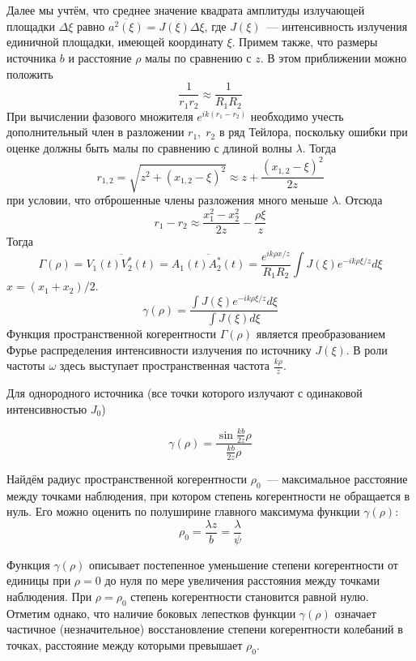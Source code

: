Далее мы учтём, что среднее значение квадрата амплитуды излучающей площадки $\Delta\xi$ равно $\overline{a^{2}\left(\xi\right)} = J(\xi) \Delta\xi$, где $J(\xi)$~---  интенсивность излучения единичной площадки, имеющей координату $\xi$. Примем также, что размеры источника $b$ и расстояние $\rho$ малы по сравнению с $z$.  В этом приближении можно положить
\[
    \frac{1}{r_{1}r_{2}} \approx \frac{1}{R_{1}R_{2}}
\]
 При вычислении фазового множителя $e^{ik\left(r_{1}-r_{2}\right)}$ необходимо учесть дополнительный член в разложении $r_{1},\; r_{2}$ в ряд Тейлора, поскольку ошибки при оценке должны быть малы по сравнению с длиной волны $\lambda$. Тогда
 \[
     r_{1,2} = \sqrt{z^{2} + \left(x_{1,2} - \xi\right)^{2}} \approx z + \frac{\left(x_{1,2} - \xi\right)^{2}}{2z}
 \]
при условии, что отброшенные члены разложения много меньше $\lambda$. Отсюда
\[
    r_{1} - r_{2} \approx \frac{x_{1}^{2} - x^{2}_{2}}{2z} - \frac{\rho\xi}{z}
\]
Тогда
\[
    \Gamma(\rho) = \overline{V_{1}(t)V_{2}^{*}(t)} = \overline{A_{1}(t)A_{2}^{*}(t)} = \frac{e^{ik\rho x/z}}{R_{1}R_{2}}\int J(\xi)e^{-ik\rho\xi / z} d\xi
\]
$x = (x_{1} + x_{2}) / 2$.
\[
    \gamma(\rho) = \frac{\int J(\xi)e^{-ik\rho\xi / z} d\xi}{\int J(\xi)d\xi}
\]
Функция пространственной когерентности $\Gamma(\rho)$ является преобразованием Фурье распределения интенсивности излучения по источнику $J(\xi)$. В роли частоты $\omega$ здесь выступает пространственная частота $\frac{k\rho}{z}$.

Для однородного источника (все точки которого излучают с одинаковой интенсивностью $J_{0}$)

\[
    \gamma(\rho) = \frac{\sin \frac{kb}{2z}\rho}{\frac{kb}{2z}\rho}
\]

Найдём радиус пространственной когерентности $\rho_{0}$~--- максимальное расстояние между точками наблюдения, при котором степень когерентности не обращается в нуль. Его можно оценить по полуширине главного максимума функции $\gamma(\rho)$:
\[
    \rho_{0} = \frac{\lambda z}{b} = \frac{\lambda}{\psi}
\]

Функция $\gamma(\rho)$ описывает постепенное уменьшение степени когерентности от единицы при $\rho = 0$ до нуля по мере увеличения расстояния между точками наблюдения. При $\rho = \rho_{0}$ степень когерентности становится равной нулю. Отметим однако, что наличие боковых лепестков функции $\gamma(\rho)$ означает частичное (незначительное) восстановление степени когерентности колебаний в точках, расстояние между которыми превышает $\rho_{0}$.
